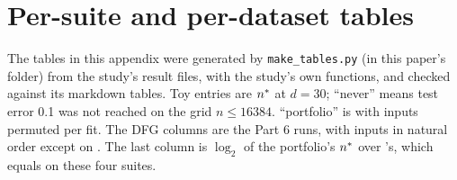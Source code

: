 \section{Per-suite and per-dataset tables}\label{app:tables}

The tables in this appendix were generated by \texttt{make\_tables.py} (in this paper's folder) from the study's result files, with the study's own functions, and checked against its markdown tables. Toy entries are $n^{*}$ at $d=30$; ``never'' means test error 0.1 was not reached on the grid $n\le16384$. ``portfolio'' is  with inputs permuted per fit. The DFG columns are the Part 6 runs, with inputs in natural order except on . The last column is $\log_2$ of the portfolio's $n^{*}$ over 's, which equals  on these four suites.

\begin{table}[h]
\centering\footnotesize\setlength{\tabcolsep}{4pt}

\caption{Toy suite  (development; in-sample for DFG and for the Part 8 designs).}
\label{tab:appdesigned}
\end{table}

\begin{table}[h]
\centering\footnotesize\setlength{\tabcolsep}{4pt}

\caption{Toy suite : 20 random formulas (development data for DFG). Networks: 2 seeds.}
\label{tab:apprandom}
\end{table}

\begin{table}[h]
\centering\footnotesize\setlength{\tabcolsep}{3.5pt}

\caption{Toy suite  (held-out 1). DFG v1$^-$ is frozen v1 without its degree-5/6 search, the blind run; DFG v1.1 is post hoc.}
\label{tab:appdlheld}
\end{table}

\begin{table}[h]
\centering\footnotesize\setlength{\tabcolsep}{4pt}

\caption{Toy suite  (held-out 2; blind for DFG v1.1, inputs permuted).}
\label{tab:appdlheld2}
\end{table}

\clearpage
\begin{table}[p]
\centering\footnotesize\setlength{\tabcolsep}{5pt}

\caption{Part 7: seed-mean test error on the 13 held-out datasets at $n=300$, 3000 and the full pool. MLP-L2 was run on tabular data at $n\le3000$. On images at $n\ge30000$ the DFG adaptations are seed 0 only.  on Fashion-MNIST was run in Part 8. Source: .}
\label{tab:apppart7}
\end{table}

